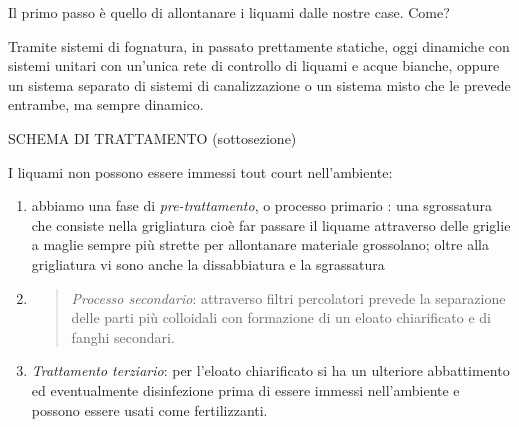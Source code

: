 \documentclass[]{article}
\begin{document}
Il primo passo è quello di allontanare i liquami dalle nostre case.
Come?

Tramite sistemi di fognatura, in passato prettamente statiche, oggi
dinamiche con sistemi unitari con un'unica rete di controllo di liquami
e acque bianche, oppure un sistema separato di sistemi di canalizzazione
o un sistema misto che le prevede entrambe, ma sempre dinamico.

SCHEMA DI TRATTAMENTO (sottosezione)

I liquami non possono essere immessi tout court nell'ambiente:

\begin{enumerate}
\def\labelenumi{\arabic{enumi}.}
\item
  abbiamo una fase di \emph{pre-trattamento}, o processo primario : una
  sgrossatura che consiste nella grigliatura cioè far passare il liquame
  attraverso delle griglie a maglie sempre più strette per allontanare
  materiale grossolano; oltre alla grigliatura vi sono anche la
  dissabbiatura e la sgrassatura
\item
  \begin{quote}
  \emph{Processo secondario}: attraverso filtri percolatori prevede la
  separazione delle parti più colloidali con formazione di un eloato
  chiarificato e di fanghi secondari.
  \end{quote}
\item
  \emph{Trattamento terziario}: per l'eloato chiarificato si ha un
  ulteriore abbattimento ed eventualmente disinfezione prima di essere
  immessi nell'ambiente e possono essere usati come fertilizzanti.
\end{enumerate}
\end{document}
